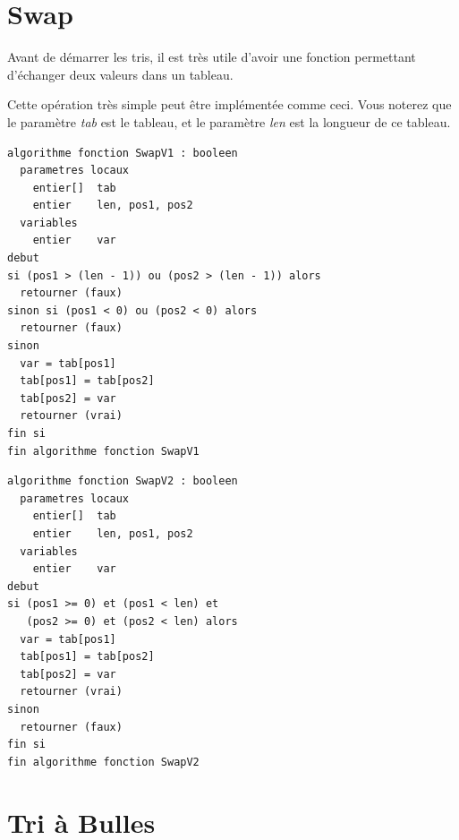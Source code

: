 \documentclass[11pt,a4paper]{article}
\begin{document}
\clearpage


\section{Swap}

\medskip

Avant de démarrer les tris, il est très utile d'avoir une fonction permettant d'échanger deux valeurs dans un tableau.

Cette opération très simple peut être implémentée comme ceci.
Vous noterez que le paramètre \textit{tab} est le tableau, et le paramètre \textit{len} est la longueur de ce tableau.


\vfillFirst

\begin{table}[ht!]
  \centering
\begin{lstlisting}[style=algorithmique]
algorithme fonction SwapV1 : booleen
  parametres locaux
    entier[]  tab
    entier    len, pos1, pos2
  variables
    entier    var
debut
si (pos1 > (len - 1)) ou (pos2 > (len - 1)) alors
  retourner (faux)
sinon si (pos1 < 0) ou (pos2 < 0) alors
  retourner (faux)
sinon
  var = tab[pos1]
  tab[pos1] = tab[pos2]
  tab[pos2] = var
  retourner (vrai)
fin si
fin algorithme fonction SwapV1 \end{lstlisting}
\end{table}


\begin{table}[ht!]
  \centering
\begin{lstlisting}[style=algorithmique]
algorithme fonction SwapV2 : booleen
  parametres locaux
    entier[]  tab
    entier    len, pos1, pos2
  variables
    entier    var
debut
si (pos1 >= 0) et (pos1 < len) et
   (pos2 >= 0) et (pos2 < len) alors
  var = tab[pos1]
  tab[pos1] = tab[pos2]
  tab[pos2] = var
  retourner (vrai)
sinon
  retourner (faux)
fin si
fin algorithme fonction SwapV2 \end{lstlisting}
\end{table}


\vfillLast

\clearpage


\section{Tri à Bulles}
\end{document}
